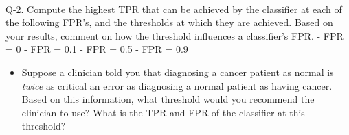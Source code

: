 \documentclass[11pt]{article}
\providecommand{\tightlist}{%
      \setlength{\itemsep}{0pt}\setlength{\parskip}{0pt}}
\begin{document}
    \begin{center}
    \end{center}
    { \hspace*{\fill} \\}
    
    Q-2. Compute the highest TPR that can be achieved by the classifier at
each of the following FPR's, and the thresholds at which they are
achieved. Based on your results, comment on how the threshold influences
a classifier's FPR. - FPR = 0 - FPR = 0.1 - FPR = 0.5 - FPR = 0.9

\begin{itemize}
\tightlist
\item
  Suppose a clinician told you that diagnosing a cancer patient as
  normal is \emph{twice} as critical an error as diagnosing a normal
  patient as having cancer. Based on this information, what threshold
  would you recommend the clinician to use? What is the TPR and FPR of
  the classifier at this threshold?
\end{itemize}
\end{document}
